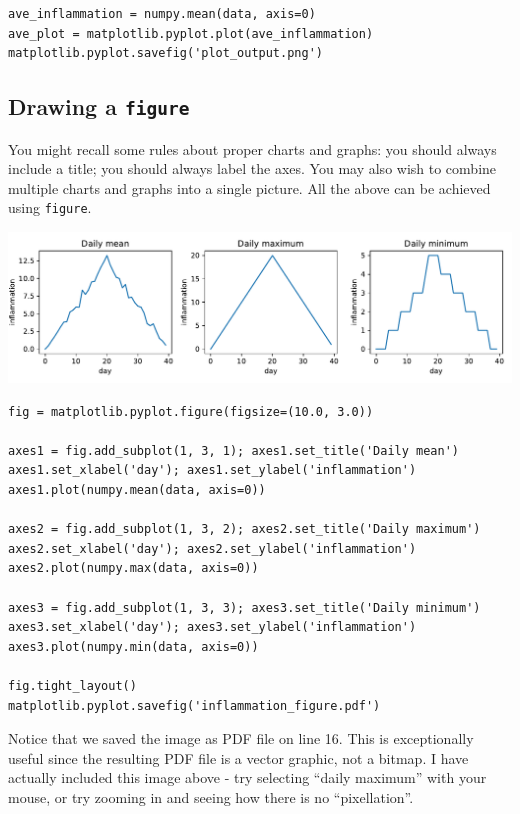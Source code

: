 \begin{multicols*}{2}
\vspace{-4mm}
\begin{verbatim}
ave_inflammation = numpy.mean(data, axis=0)
ave_plot = matplotlib.pyplot.plot(ave_inflammation)
matplotlib.pyplot.savefig('plot_output.png')
\end{verbatim}


\subsection{Drawing a \texttt{figure}}

\par
You might recall some rules about proper charts and graphs: you should always include a title; you should always label the axes. You may also wish to combine multiple charts and graphs into a single picture. All the above can be achieved using \texttt{figure}.

\includegraphics[width=\linewidth]{graphics/inflammation_figure.pdf}

\vspace{-4mm}
\begin{verbatim}
fig = matplotlib.pyplot.figure(figsize=(10.0, 3.0))

axes1 = fig.add_subplot(1, 3, 1); axes1.set_title('Daily mean')
axes1.set_xlabel('day'); axes1.set_ylabel('inflammation')
axes1.plot(numpy.mean(data, axis=0))

axes2 = fig.add_subplot(1, 3, 2); axes2.set_title('Daily maximum')
axes2.set_xlabel('day'); axes2.set_ylabel('inflammation')
axes2.plot(numpy.max(data, axis=0))

axes3 = fig.add_subplot(1, 3, 3); axes3.set_title('Daily minimum')
axes3.set_xlabel('day'); axes3.set_ylabel('inflammation')
axes3.plot(numpy.min(data, axis=0))

fig.tight_layout()
matplotlib.pyplot.savefig('inflammation_figure.pdf')
\end{verbatim}

Notice that we saved the image as PDF file on line 16. This is exceptionally useful since the resulting PDF file is a vector graphic, not a bitmap. I have actually included this image above - try selecting ``daily maximum'' with your mouse, or try zooming in and seeing how there is no ``pixellation''.

\end{multicols*}
